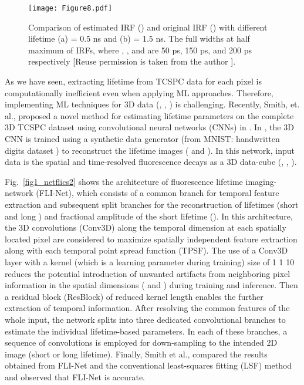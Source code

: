 \documentclass[12pt]{iopart}
\begin{document}
\begin{figure}[!t]
\centering
\texttt{[image: Figure8.pdf]}
\caption{Comparison of estimated IRF () and original IRF () with different lifetime (a)  = 0.5 ns and (b)  = 1.5 ns. The full widths at half maximum of IRFs,  where , , and  are 50 ps, 150 ps, and 200 ps respectively [Reuse permission is taken from the author \cite{em}].}\label{fig1_em}
\end{figure}

As we have seen, extracting lifetime from TCSPC data for each pixel is computationally inefficient even when applying ML approaches. Therefore, implementing ML techniques for 3D data (, , ) is challenging. Recently, Smith, et. al., proposed a novel method for estimating lifetime parameters on the complete 3D TCSPC dataset using convolutional neural networks (CNNs) in \cite{netflics2}. In \cite{netflics2}, the 3D CNN is trained using a synthetic data generator (from MNIST: handwritten digits dataset \cite{mnist}) to reconstruct the lifetime images ( and ). In this network, input data is the spatial and time-resolved fluorescence decays as a 3D data-cube (, , ).

Fig.~\ref{fig1_netflics2} shows the architecture of fluorescence lifetime imaging-network (FLI-Net), which consists of a common branch for temporal feature extraction and subsequent split branches for the reconstruction of lifetimes (short  and long ) and fractional amplitude of the short lifetime (). In this architecture, the 3D convolutions (Conv3D) along the temporal dimension at each spatially located pixel are considered to maximize spatially independent feature extraction along with each temporal point spread function (TPSF). The use of a Conv3D layer with a kernel (which is a learning parameter during training) size of 1  1  10 reduces the potential introduction of unwanted artifacts from neighboring pixel information in the spatial dimensions ( and ) during training and inference. Then a residual block (ResBlock) of reduced kernel length enables the further extraction of temporal information. After resolving the common features of the whole input, the network splits into three dedicated convolutional branches to estimate the individual lifetime-based parameters. In each of these branches, a sequence of convolutions is employed for down-sampling to the intended 2D image (short or long lifetime). Finally, Smith et al., \cite{netflics2} compared the results obtained from FLI-Net and the conventional least-squares fitting (LSF) method and observed that FLI-Net is accurate. 
\end{document}
